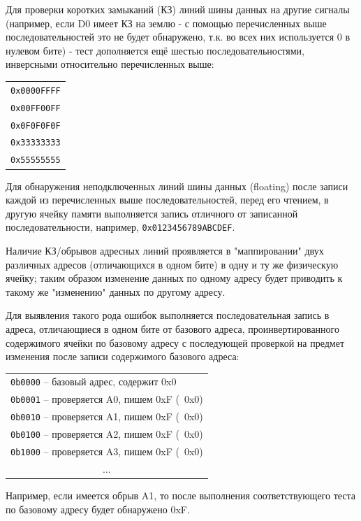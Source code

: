 \documentclass[a4paper,14pt,bachelor]{disser}
\begin{document}
Для проверки коротких замыканий (КЗ) линий шины данных на другие сигналы (например, если D0 имеет КЗ на землю - с помощью перечисленных выше последовательностей это не будет обнаружено, т.к. во всех них используется 0 в нулевом бите) - тест дополняется ещё шестью последовательностями, инверсными относительно перечисленных выше:
\begin{center}
\begin{longtable}{c}
\texttt{0x0000FFFF}\\
\texttt{0x00FF00FF}\\
\texttt{0x0F0F0F0F}\\
\texttt{0x33333333}\\
\texttt{0x55555555}\\
\end{longtable}
\end{center}

Для обнаружения неподключенных линий шины данных (floating) после записи каждой из перечисленных выше последовательностей, перед его чтением, в другую ячейку памяти выполняется запись отличного от записанной последовательности, например, \texttt{0x0123456789ABCDEF}.

Наличие КЗ/обрывов адресных линий проявляется в "маппировании" двух различных адресов (отличающихся в одном бите) в одну и ту же физическую ячейку; таким образом изменение данных по одному адресу будет приводить к такому же "изменению" данных по другому адресу.

Для выявления такого рода ошибок выполняется последовательная запись в адреса, отличающиеся в одном бите от базового адреса, проинвертированного содержимого ячейки по базовому адресу с последующей проверкой на предмет изменения после записи содержимого базового адреса:
\begin{center}
\begin{longtable}{l}
	\texttt{0b0000} -- базовый адрес, содержит 0x0\\
	\texttt{0b0001} -- проверяется A0, пишем 0xF (~0x0)\\
	\texttt{0b0010} -- проверяется A1, пишем 0xF (~0x0)\\
	\texttt{0b0100} -- проверяется A2, пишем 0xF (~0x0)\\
	\texttt{0b1000} -- проверяется A3, пишем 0xF (~0x0)\\
	\multicolumn{1}{c}{...}\\
\end{longtable}
\end{center}

Например, если имеется обрыв A1, то после выполнения соответствующего теста по базовому адресу будет обнаружено 0xF.
\end{document}
